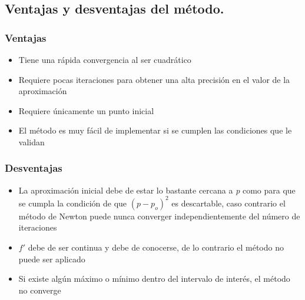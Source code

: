 \subsection{Ventajas y desventajas del método.}

\subsubsection{Ventajas}

\begin{itemize}
    \item Tiene una rápida convergencia al ser cuadrático
    \item Requiere pocas iteraciones para obtener una alta precisión en el valor de la aproximación
    \item Requiere únicamente un punto inicial
    \item El método es muy fácil de implementar si se cumplen las condiciones que le validan
\end{itemize}

\subsubsection{Desventajas}

\begin{itemize}
    \item La aproximación inicial debe de estar lo bastante cercana a \textit{p} como para que se cumpla la  condición de que $( p - p_o )^2$ es descartable, caso contrario el método de Newton puede nunca converger independientemente del número de iteraciones \cite{Burden_English}
    \item $f'$ debe de ser continua y debe de conocerse, de lo contrario el método no puede ser aplicado
    \item Si existe algún máximo o mínimo dentro del intervalo de interés, el método no converge
\end{itemize}